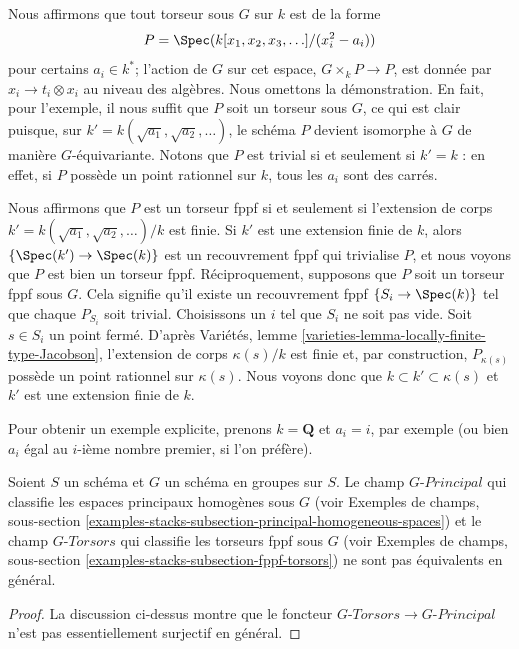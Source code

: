 \medskip\noindent
Nous affirmons que tout torseur sous $G$ sur $k$ est de la forme
$$
P = \Spec(k[x_1, x_2, x_3, \ldots]/(x_i^2 - a_i))
$$
pour certains $a_i \in k^*$; l'action de $G$ sur cet espace, $G \times_k P \to P$,
est donnée par $x_i \to t_i \otimes x_i$ au niveau des algèbres.
Nous omettons la démonstration.
En fait, pour l'exemple, il nous suffit que $P$ soit un torseur sous $G$,
ce qui est clair puisque, sur $k' = k(\sqrt{a_1}, \sqrt{a_2}, \ldots)$,
le schéma $P$ devient isomorphe à $G$ de manière $G$-équivariante.
Notons que $P$ est trivial si et seulement si $k' = k$ : en effet, si
$P$ possède un point rationnel sur $k$, tous les $a_i$ sont des carrés.

\medskip\noindent
Nous affirmons que $P$ est un torseur fppf si et seulement si l'extension de corps
$k' = k(\sqrt{a_1}, \sqrt{a_2}, \ldots)/k$ est finie.
Si $k'$ est une extension finie de $k$, alors
$\{\Spec(k') \to \Spec(k)\}$
est un recouvrement fppf qui trivialise $P$, et nous voyons que $P$ est bien
un torseur fppf. Réciproquement, supposons que $P$ soit un torseur fppf sous $G$.
Cela signifie qu'il existe un recouvrement fppf
$\{S_i \to \Spec(k)\}$ tel que chaque $P_{S_i}$ soit trivial.
Choisissons un $i$ tel que $S_i$ ne soit pas vide. Soit $s \in S_i$ un point
fermé. D'après
Variétés, lemme \ref{varieties-lemma-locally-finite-type-Jacobson},
l'extension de corps $\kappa(s)/k$ est finie et, par construction,
$P_{\kappa(s)}$ possède un point rationnel sur $\kappa(s)$. Nous voyons donc que
$k \subset k' \subset \kappa(s)$ et $k'$ est une extension finie de $k$.

\medskip\noindent
Pour obtenir un exemple explicite, prenons $k = \mathbf{Q}$ et $a_i = i$,
par exemple (ou bien $a_i$ égal au $i$-ième nombre premier, si l'on préfère).

\begin{lemma}
\label{lemma-torsors-principal-spaces-not-equal}
Soient $S$ un schéma et $G$ un schéma en groupes sur $S$.
Le champ $G\textit{-Principal}$ qui classifie les espaces principaux homogènes sous $G$
(voir Exemples de champs, sous-section
\ref{examples-stacks-subsection-principal-homogeneous-spaces})
et le champ $G\textit{-Torsors}$ qui classifie les torseurs fppf sous $G$
(voir Exemples de champs, sous-section
\ref{examples-stacks-subsection-fppf-torsors})
ne sont pas équivalents en général.
\end{lemma}

\begin{proof}
La discussion ci-dessus montre que le foncteur
$G\textit{-Torsors} \to G\textit{-Principal}$ n'est pas essentiellement
surjectif en général.
\end{proof}









